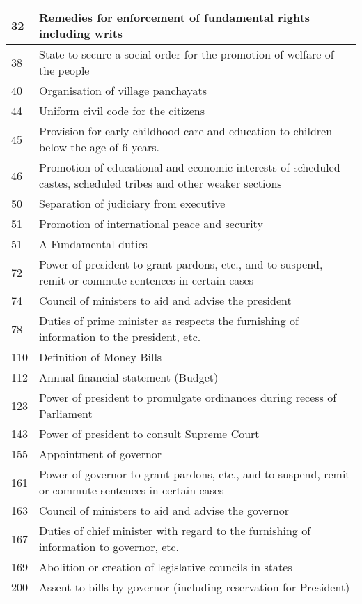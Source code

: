 \begin{longtable}[c]{@{}|p{2cm}|p{10cm}|@{}}
  32 & Remedies for enforcement of fundamental rights including writs \\ \midrule
  38 & State to secure a social order for the promotion of welfare of the people \\ \midrule
  40 & Organisation of village panchayats \\ \midrule
  44 & Uniform civil code for the citizens \\ \midrule
  45 & Provision for early childhood care and education to children below the age of 6 years. \\ \midrule
  46 & Promotion of educational and economic interests of scheduled castes, scheduled tribes and other weaker sections \\ \midrule
  50 & Separation of judiciary from executive \\ \midrule
  51 & Promotion of international peace and security \\ \midrule
  51 & A Fundamental duties \\ \midrule
  72 & Power of president to grant pardons, etc., and to suspend, remit or commute sentences in certain cases \\ \midrule
  74 & Council of ministers to aid and advise the president \\
  78 & Duties of prime minister as respects the furnishing of information to the president, etc. \\ \midrule
  110 & Definition of Money Bills \\ \midrule
  112 & Annual financial statement (Budget) \\ \midrule
  123 & Power of president to promulgate ordinances during recess of Parliament \\ \midrule
  143 & Power of president to consult Supreme Court \\ \midrule
  155 & Appointment of governor \\ \midrule
  161 & Power of governor to grant pardons, etc., and to suspend, remit or commute sentences in certain cases \\ \midrule
  163 & Council of ministers to aid and advise the governor \\ \midrule
  167 & Duties of chief minister with regard to the furnishing of information to governor, etc. \\ \midrule
  169 & Abolition or creation of legislative councils in states \\ \midrule
  200 & Assent to bills by governor (including reservation for President) \\ \midrule

\end{longtable}

